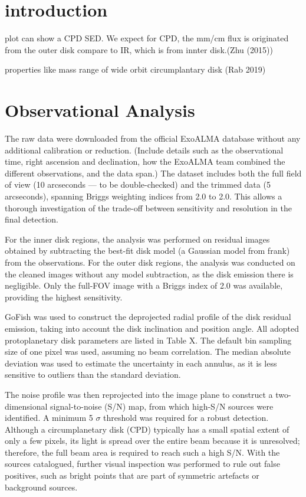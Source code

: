 \documentclass{article}
\begin{document}
\section{introduction}

plot can show a CPD SED. 
We expect for CPD, the mm/cm flux is originated from the outer disk compare to IR, which is from innter disk.(Zhu (2015))

properties like mass range of wide orbit circumplantary disk (Rab 2019)
\section{Observational Analysis}

The raw data were downloaded from the official ExoALMA database without any additional calibration or reduction.
(Include details such as the observational time, right ascension and declination, how the ExoALMA team combined the different observations, and the data span.)
The dataset includes both the full field of view (10 arcseconds — to be double-checked) and the trimmed data (5 arcseconds), spanning Briggs weighting indices from 2.0 to 2.0.
This allows a thorough investigation of the trade-off between sensitivity and resolution in the final detection.

For the inner disk regions, the analysis was performed on residual images obtained by subtracting the best-fit disk model (a Gaussian model from frank) from the observations.
For the outer disk regions, the analysis was conducted on the cleaned images without any model subtraction, as the disk emission there is negligible.
Only the full-FOV image with a Briggs index of 2.0 was available, providing the highest sensitivity.

GoFish was used to construct the deprojected radial profile of the disk residual emission, taking into account the disk inclination and position angle.
All adopted protoplanetary disk parameters are listed in Table X.
The default bin sampling size of one pixel was used, assuming no beam correlation.
The median absolute deviation was used to estimate the uncertainty in each annulus, as it is less sensitive to outliers than the standard deviation.

The noise profile was then reprojected into the image plane to construct a two-dimensional signal-to-noise (S/N) map, from which high-S/N sources were identified.
A minimum 5 $\sigma$ threshold was required for a robust detection.
Although a circumplanetary disk (CPD) typically has a small spatial extent of only a few pixels, its light is spread over the entire beam because it is unresolved; therefore, the full beam area is required to reach such a high S/N.
With the sources catalogued, further visual inspection was performed to rule out false positives, such as bright points that are part of symmetric artefacts or background sources.
\end{document}
